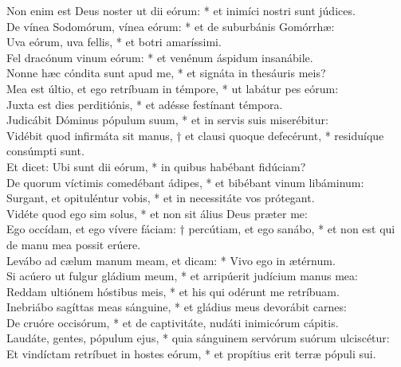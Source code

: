 {	Non enim est Deus noster ut dii eórum: * et inimíci nostri sunt júdices. \\
	De vínea Sodomórum, vínea eórum: * et de suburbánis Gomórrhæ:  \\
	Uva eórum, uva fellis, * et botri amaríssimi. \\
	Fel dracónum vinum eórum: * et venénum áspidum insanábile. \\
	Nonne hæc cóndita sunt apud me, * et signáta in thesáuris meis? \\
	Mea est últio, et ego retríbuam in témpore, * ut labátur pes eórum:  \\
	Juxta est dies perditiónis, * et adésse festínant témpora. \\
	Judicábit Dóminus pópulum suum, * et in servis suis miserébitur:  \\
	Vidébit quod infirmáta sit manus, † et clausi quoque defecérunt, * residuíque consúmpti sunt. \\
	Et dicet: Ubi sunt dii eórum, * in quibus habébant fidúciam? \\
	De quorum víctimis comedébant ádipes, * et bibébant vinum libáminum:  \\
	Surgant, et opituléntur vobis, * et in necessitáte vos prótegant. \\
	Vidéte quod ego sim solus, * et non sit álius Deus præter me:  \\
	Ego occídam, et ego vívere fáciam: † percútiam, et ego sanábo, * et non est qui de manu mea possit erúere. \\
	Levábo ad cælum manum meam, et dicam: * Vivo ego in ætérnum. \\
	Si acúero ut fulgur gládium meum, * et arripúerit judícium manus mea:  \\
	Reddam ultiónem hóstibus meis, * et his qui odérunt me retríbuam. \\
	Inebriábo sagíttas meas sánguine, * et gládius meus devorábit carnes:  \\
	De cruóre occisórum, * et de captivitáte, nudáti inimicórum cápitis. \\
	Laudáte, gentes, pópulum ejus, * quia sánguinem servórum suórum ulciscétur:  \\
	Et vindíctam retríbuet in hostes eórum, * et propítius erit terræ pópuli sui. \\
}


